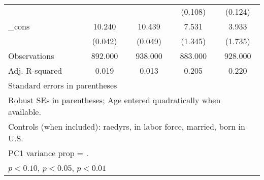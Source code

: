 \begin{table}[htbp]
\begin{tabular}{l*{4}{c}}
          &                  &                  &  (0.108)         &  (0.124)         \\
\_cons    &   10.240\sym{***}&   10.439\sym{***}&    7.531\sym{***}&    3.933\sym{**} \\
          &  (0.042)         &  (0.049)         &  (1.345)         &  (1.735)         \\
\midrule
Observations&  892.000         &  938.000         &  883.000         &  928.000         \\
Adj. R-squared&    0.019         &    0.013         &    0.205         &    0.220         \\
\bottomrule
\multicolumn{5}{l}{\footnotesize Standard errors in parentheses}\\
\multicolumn{5}{l}{\footnotesize Robust SEs in parentheses; Age entered quadratically when available.}\\
\multicolumn{5}{l}{\footnotesize Controls (when included): raedyrs, in labor force, married, born in U.S.}\\
\multicolumn{5}{l}{\footnotesize PC1 variance prop =      .}\\
\multicolumn{5}{l}{\footnotesize \sym{*} \(p<0.10\), \sym{**} \(p<0.05\), \sym{***} \(p<0.01\)}\\
\end{tabular}
\end{table}
